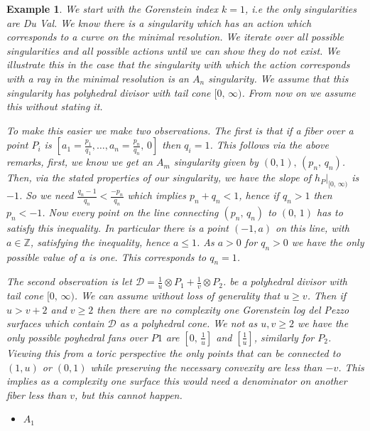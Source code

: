 \documentclass[12pt,a4paper]{book}      %
\newtheorem{ex}[thm]{Example}
\newcommand{\mb}[1]{\mathbb{#1}}
\begin{document}
\begin{ex}\rm

We start with the Gorenstein index $k = 1$, i.e the only singularities are Du Val. We know there is a singularity which has an action which corresponds to a curve on the minimal resolution. We iterate over all possible singularities and all possible actions until we can show they do not exist. We illustrate this in the case that the singularity with which the action corresponds with a ray in the minimal resolution is an $A_n$ singularity. We assume that this singularity has polyhedral divisor with tail cone $[ 0, \, \infty)$. From now on we assume this without stating it.

To make this easier we make two observations. The first is that if a fiber over a point $P_i$ is $[a_1 = \frac{p_1}{q_1} , \dots, a_n = \frac{p_n}{q_n}, \, 0]$ then $q_i = 1$. This follows via the above remarks, first, we know we get an $A_m$ singularity given by $(0, 1), \, (p_n,  \, q_n)$. Then, via the stated properties of our singularity, we have the slope of $h_P|_{[0, \, \infty)}$ is $-1$. So we need $\frac{q_n-1}{q_n} < \frac{-p_n}{q_n}$ which implies $p_n + q_n < 1$, hence if $q_n > 1$ then $p_n < -1$. Now every point on the line connecting $(p_n, \, q_n)$ to $(0, \, 1)$ has to satisfy this inequality. In particular there is a point $(-1, a)$ on this line, with $a  \in \mb{Z}$, satisfying the inequality, hence $ a \leq 1$. As $ a>0$ for $q_n>0$ we have the only possible value of $a$ is one. This corresponds to $q_n = 1$.


The second observation is let $\mathcal{D} = \frac{1}{u} \otimes P_1 + \frac{1}{v} \otimes P_2$. be a polyhedral divisor with tail cone $[ 0 , \, \infty)$. We can assume without loss of generality that $u \geq v$. Then if $u>v+2$ and $v \geq 2$ then there are no complexity one Gorenstein log del Pezzo surfaces which contain $\mathcal{D}$ as a polyhedral cone. We not as $u,  v \geq 2$ we have the only possible poyhedral fans over $P1$ are $[0, \, \frac{1}{u}
]$ and $[\frac{1}{u}]$, similarly for $P_2$. Viewing this from a toric perspective the only points that can be connected to $(1,u)$ or $(0,1)$ while preserving the necessary convexity are less than $-v$. This implies as a complexity one surface this would need a denominator on another fiber less than $v$, but this cannot happen. 

\begin{itemize}

\item  $A_1$


\end{itemize}
\end{ex}
\end{document}
